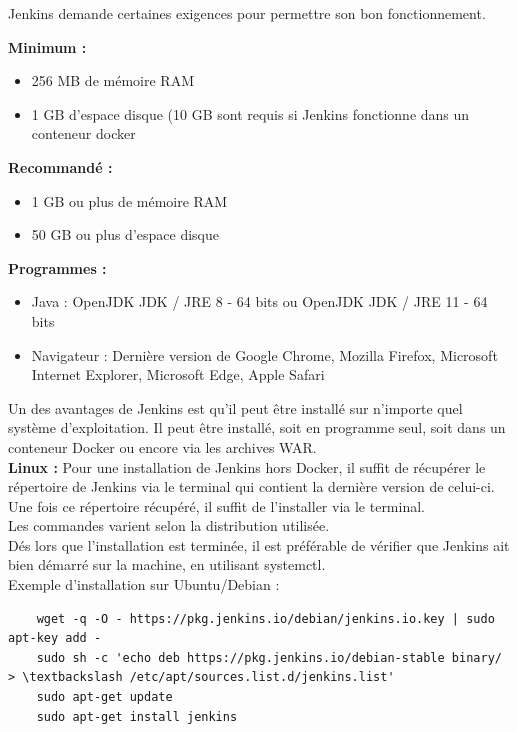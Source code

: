 \documentclass[12pt]{article}
\begin{document}
Jenkins demande certaines exigences pour permettre son bon fonctionnement.
\\
\vspace{0.5cm}

\textbf{Minimum :}
\begin{itemize}
\item 256 MB de mémoire RAM
\item 1 GB d'espace disque (10 GB sont requis si Jenkins fonctionne dans un conteneur docker
\end{itemize}

\vspace{0.5cm}

\textbf{Recommandé :}
\begin{itemize}
\item 1 GB ou plus de mémoire RAM
\item 50 GB ou plus d'espace disque
\end{itemize}

\vspace{0.5cm}

\textbf{Programmes :}
\begin{itemize}
\item Java : OpenJDK JDK / JRE 8 - 64 bits ou OpenJDK JDK / JRE 11 - 64 bits
\item Navigateur : Dernière version de Google Chrome, Mozilla Firefox, Microsoft Internet Explorer, Microsoft Edge, Apple Safari
\end{itemize}

\vspace{0.5cm}
Un des avantages de Jenkins est qu'il peut être installé sur n'importe quel système d'exploitation. Il peut être installé, soit en programme seul, soit dans un conteneur Docker ou encore via les archives WAR.
\\
\textbf{Linux :}
Pour une installation de Jenkins hors Docker, il suffit de récupérer le répertoire de Jenkins via le terminal qui contient la dernière version de celui-ci. Une fois ce répertoire récupéré, il suffit de l'installer via le terminal.
\\
Les commandes varient selon la distribution utilisée.
\\
Dés lors que l'installation est terminée, il est préférable de vérifier que Jenkins ait bien démarré sur la machine, en utilisant systemctl.
\vspace{0.5cm}
\\
Exemple d'installation sur Ubuntu/Debian :
\begin{lstlisting}
    wget -q -O - https://pkg.jenkins.io/debian/jenkins.io.key | sudo apt-key add -
    sudo sh -c 'echo deb https://pkg.jenkins.io/debian-stable binary/ > \textbackslash /etc/apt/sources.list.d/jenkins.list'
    sudo apt-get update
    sudo apt-get install jenkins
\end{lstlisting}
\end{document}

